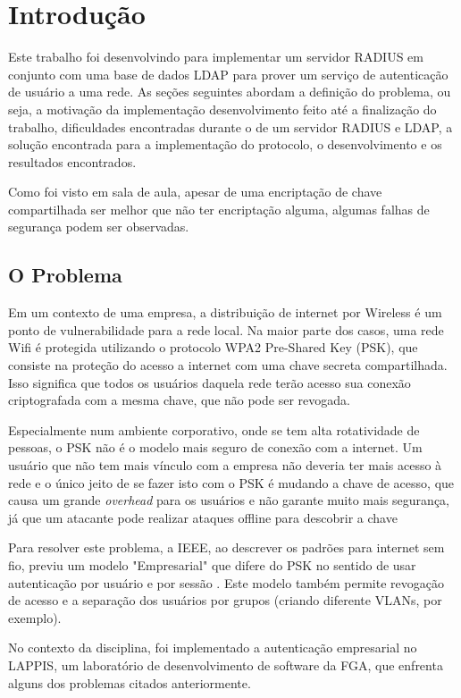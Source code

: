 \section{Introdução}

Este trabalho foi desenvolvindo para implementar um servidor RADIUS em conjunto com uma
base de dados LDAP para prover um serviço de autenticação de usuário a uma rede.
As seções seguintes abordam a definição do problema, ou seja, a motivação da implementação
desenvolvimento feito até a finalização do trabalho, dificuldades encontradas durante o
de um servidor RADIUS e LDAP, a solução encontrada para a implementação do protocolo, o
desenvolvimento e os resultados encontrados.

Como foi visto em sala de aula, apesar de uma encriptação de chave compartilhada
ser melhor que não ter encriptação alguma, algumas falhas de segurança podem ser
observadas.


\subsection{O Problema}

Em um contexto de uma empresa, a distribuição de internet por Wireless é um ponto de
vulnerabilidade para a rede local. Na maior parte dos casos, uma rede Wifi é protegida
utilizando o protocolo WPA2 Pre-Shared Key (PSK), que consiste na proteção do acesso a internet com uma
chave secreta compartilhada. Isso significa que todos os usuários daquela rede terão acesso
sua conexão criptografada com a mesma chave, que não pode ser revogada. \cite{freeradius}

Especialmente num ambiente corporativo, onde se tem alta rotatividade de pessoas,
o PSK não é o modelo mais seguro de conexão com a internet. Um usuário que não tem
mais vínculo com a empresa não deveria ter mais acesso à rede e o único jeito de se
fazer isto com o PSK é mudando a chave de acesso, que causa um grande \textit{overhead}
para os usuários e não garante muito mais segurança, já que um atacante pode realizar
ataques offline para descobrir a chave \cite{freeradius}

Para resolver este problema, a IEEE, ao descrever os padrões para internet sem fio,
previu um modelo "Empresarial" que difere do PSK no sentido de usar autenticação
por usuário e por sessão \cite{freeradius}. Este modelo também permite revogação de
acesso e a separação dos usuários por grupos (criando diferente VLANs, por exemplo). \cite{freeradius}

No contexto da disciplina, foi implementado a autenticação empresarial no LAPPIS,
um laboratório de desenvolvimento de software da FGA, que enfrenta alguns dos
problemas citados anteriormente.


